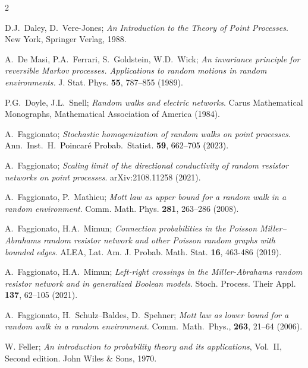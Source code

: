 \documentclass[12pt,a4paper,reqno]{amsart}
\newcommand{\rosso}{\textcolor{black}} %
\begin{document}
\begin{thebibliography}{2}
    
 D.J.~Daley, D.~Vere-Jones;  \emph{An Introduction to the Theory of Point Processes}. New York, Springer Verlag, 1988.




   A.\ De Masi, P.A.\ Ferrari, S.\ Goldstein, W.D.\ Wick; \emph{An invariance principle for reversible Markov processes. Applications to random motions in random environments.}  J. Stat. Phys. {\bf  55}, 787--855 (1989).



 P.G.~Doyle, J.L.~Snell; \emph{Random walks and electric networks}. Carus Mathematical Monographs, Mathematical Association of America  (1984). 




  A.~Faggionato; \emph{Stochastic homogenization of random walks on  point processes}. \rosso{Ann.~Inst.~H.~Poincar\'{e} Probab.~Statist. {\bf 59}, 662--705 (2023).}
 

 
  


 A.~Faggionato; \emph{Scaling limit of the \rosso{directional} conductivity of random resistor networks on point processes}. arXiv:2108.11258 (2021).



 A.\ Faggionato, P.\ Mathieu; \emph{Mott law as upper bound for a random
walk in a random environment}. Comm. Math. Phys. {\bf 281}, 263--286
(2008). 


 A.~Faggionato, H.A.~Mimun; \emph{Connection probabilities in the Poisson Miller--Abrahams random resistor network and other Poisson random graphs with bounded edges}.  ALEA, Lat. Am. J. Probab. Math. Stat. {\bf 16}, 463-486 (2019).

 A.~Faggionato, H.A.~Mimun;
\emph{Left-right crossings in the Miller-Abrahams random resistor network and in generalized Boolean models}.   Stoch. Process. Their Appl. {\bf 137}, 62--105 (2021).




 A.\ Faggionato, H.\ Schulz--Baldes, D.\ Spehner; {\em
     Mott law as lower bound for a random walk in a random
     environment.} Comm.\ Math.\ Phys., {\bf 263},
     21--64 (2006).


 W. Feller; \emph{An introduction to probability theory and its applications},  Vol.~II,  Second edition. John Wiles \& Sons, 1970. %




\end{thebibliography}
\end{document}
